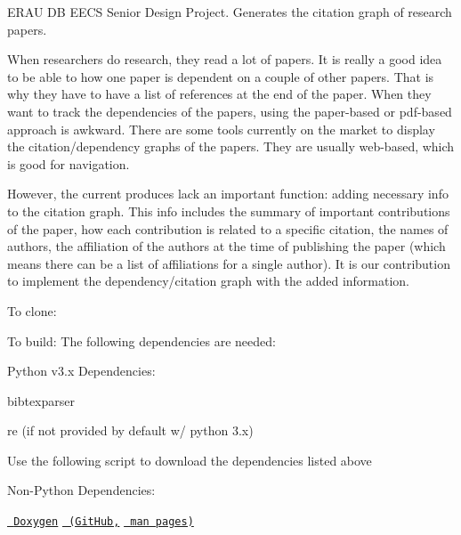 E\+R\+AU DB E\+E\+CS Senior Design Project. Generates the citation graph of research papers.

When researchers do research, they read a lot of papers. It is really a good idea to be able to how one paper is dependent on a couple of other papers. That is why they have to have a list of references at the end of the paper. When they want to track the dependencies of the papers, using the paper-\/based or pdf-\/based approach is awkward. There are some tools currently on the market to display the citation/dependency graphs of the papers. They are usually web-\/based, which is good for navigation.

However, the current produces lack an important function\+: adding necessary info to the citation graph. This info includes the summary of important contributions of the paper, how each contribution is related to a specific citation, the names of authors, the affiliation of the authors at the time of publishing the paper (which means there can be a list of affiliations for a single author). It is our contribution to implement the dependency/citation graph with the added information.

To clone\+: 
\begin{DoxyCode}{0}
\end{DoxyCode}
 To build\+: The following dependencies are needed\+:

Python v3.\+x Dependencies\+:
\begin{DoxyItemize}
\item {\ttfamily bibtexparser}
\item {\ttfamily re} (if not provided by default w/ python 3.\+x)
\end{DoxyItemize}

Use the following script to download the dependencies listed above 
\begin{DoxyCode}{0}
\end{DoxyCode}


Non-\/\+Python Dependencies\+:
\begin{DoxyItemize}
\item \href{https://www.doxygen.nl/index.html}{\texttt{ Doxygen}} \href{https://github.com/doxygen/doxygen}{\texttt{ (Git\+Hub,}} \href{https://docs.oracle.com/cd/E88353_01/html/E37839/doxygen-1.html}{\texttt{ man pages)}} 
\end{DoxyItemize}